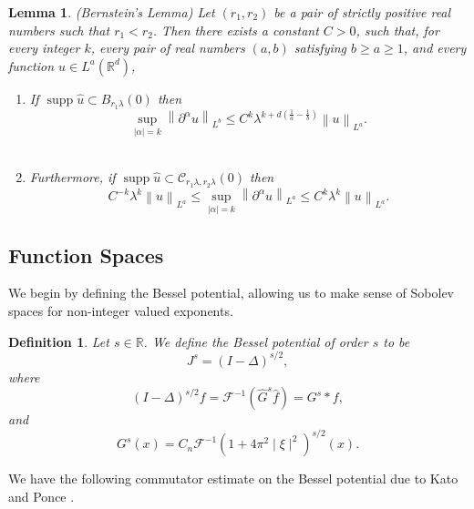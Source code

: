 \documentclass[12pt,xcolor=svgnames]{amsart}
\newtheorem{lemma}[theorem]{Lemma}
\newtheorem{definition}[theorem]{Definition}
\newcommand{\R}{\mathbb{R}}
\newcommand{\abs}[1]{\mid\!#1\!\mid}
\newcommand{\norm}[2]{\left\lVert#1\right\rVert_{#2}}
\DeclareMathOperator\supp{supp}
\begin{document}
\begin{lemma}
\label{Bernstein's Lemma}(Bernstein's Lemma) Let $(r_1,r_2)$ be a pair of strictly positive real numbers such that $r_1<r_2$. Then there exists a constant $C>0$, such that, for every integer $k$, every pair of real numbers $(a,b)$ satisfying $b \geq a \geq 1$, and every function $u \in L^a(\R^d)$,
\begin{enumerate}

\item 
\label{Berstein in Ball}
If $\supp{\hat{u}} \subset B_{r_1\lambda}(0)$ then
\begin{equation*}
 \sup_{\abs{\alpha} = k} \norm{\partial^{\alpha}u}{L^b} \leq C^k\lambda^{k+d(\frac{1}{a}-\frac{1}{b})}\norm{u}{L^a}.
\end{equation*}\\
\item 
\label{Berstein in Annulus}
Furthermore, if $\supp{\hat{u}} \subset \mathcal{C}_{r_1\lambda, r_2\lambda}(0)$ then
\begin{equation*}
 C^{-k}\lambda^k\norm{u}{L^a} \leq  \sup_{\abs{\alpha} = k} \norm{\partial^{\alpha}u}{L^a} \leq C^k\lambda^k\norm{u}{L^a}.
\end{equation*}
\end{enumerate}
\end{lemma}

\subsection{Function Spaces}

We begin by defining the Bessel potential, allowing us to make sense of Sobolev spaces for non-integer valued exponents.
\begin{definition} Let $s\in \R$. We define the Bessel potential of order $s$ to be $$J^s=(I-\Delta)^{s/2},$$ where  
$$
(I-\Delta)^{s/2}f = \mathcal{F}^{-1}(\widehat{G}^s\widehat{f}) = G^s \ast f,
$$
and
$$
G^s(x)= C_n \mathcal{F}^{-1}\left(1+4\pi^2\abs{\xi}^2\right)^{s/2}(x).
$$
\end{definition}
We have the following commutator estimate on the Bessel potential due to Kato and Ponce \cite{6}.
\end{document}
